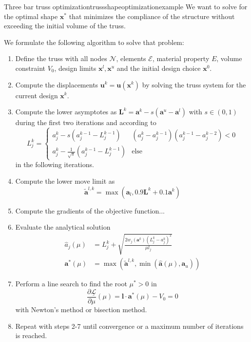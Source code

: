 \begin{example}{Three bar truss optimization}{trussshapeoptimizationexample}
    We want to solve for the optimal shape $\mathbf{x}^*$ that minimizes the compliance of the structure without exceeding the initial volume of the truss.

    We formulate the following algorithm to solve that problem: 
    \begin{enumerate}
        \item Define the truss with all nodes $\mathcal{N}$, elements $\mathcal{E}$, material property $E$, volume constraint $V_0$, design limits $\mathbf{x}^l, \mathbf{x}^u$ and the initial design choice $\mathbf{x}^0$.
        \item Compute the displacements $\mathbf{u}^k = \mathbf{u}(\mathbf{x}^k)$ by solving the truss system for the current design $\mathbf{x}^k$.
        \item Compute the lower asymptotes as $\mathbf{L}^k =\mathbf{a}^k - s (\mathbf{a}^u - \mathbf{a}^l)$ with $s \in (0,1)$ during the first two iterations and according to 
        \begin{equation}
            L^k_j = 
            \begin{cases}
                a^k_j - s  (a^{k-1}_j-L^{k-1}_j) & (a_j^k-a_j^{k-1})(a_j^{k-1}-a_j^{k-2}) < 0\\
                a^k_j - \frac{1}{\sqrt{s}}  (a^{k-1}_j-L^{k-1}_j) & \text{else}
            \end{cases}
        \end{equation}
        in the following iterations.


        \item Compute the lower move limit as 
        \begin{equation}
            \tilde{\mathbf{a}}^{l,k} = \max(\mathbf{a}_l,  0.9 \mathbf{L}^k + 0.1 \mathbf{a}^k)
        \end{equation}

        \item Compute the gradients of the objective function...

        \item Evaluate the analytical solution
            \begin{align}
                \hat{a}_j(\mu) &= L_j^k + \sqrt{\frac{2 w_j (\mathbf{a}^k)
                (L^k_j-a^k_j)^2}{\mu l_j}} \\
                \mathbf{a}^* (\mu) &= \max\left(\tilde{\mathbf{a}}^{l,k}, \min \left(\hat{\mathbf{a}}(\mu), \mathbf{a}_u \right)\right)
            \end{align}
        \item Perform a line search to find the root $\mu^*>0$ in 
        \begin{equation}
            \frac{\partial \underline{\mathcal{L}}}{\partial \mu}(\mu) = \mathbf{l} \cdot \mathbf{a}^* (\mu) - V_0 = 0
        \end{equation}
        with Newton's method or bisection method. 
        \item Repeat with steps 2-7 until convergence or a maximum number of iterations is reached.
    \end{enumerate}


\end{example}
